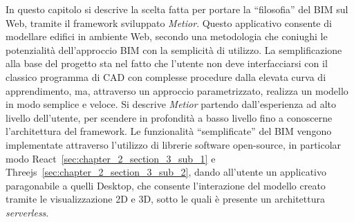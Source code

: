 In questo capitolo si descrive la scelta fatta per portare la ``filosofia'' del BIM sul Web, tramite il framework sviluppato
\emph{Metior}.
Questo applicativo consente di modellare edifici in ambiente Web, secondo una metodologia che coniughi le potenzialità
dell’approccio BIM con la semplicità di utilizzo.
La semplificazione alla base del progetto sta nel fatto che l'utente non deve interfacciarsi con il classico programma
di CAD con complesse procedure dalla elevata curva di apprendimento, ma, attraverso un approccio parametrizzato,
realizza un modello in modo semplice e veloce.
Si descrive \emph{Metior} partendo dall'esperienza ad alto livello dell'utente, per scendere in profondità
a basso livello fino a conoscerne l'architettura del framework.
Le funzionalità ``semplificate'' del BIM vengono implementate attraverso l'utilizzo di librerie software open-source,
in particolar modo React~\ref{sec:chapter_2_section_3_sub_1}
 e Threejs~\ref{sec:chapter_2_section_3_sub_2}, dando all'utente un applicativo paragonabile a quelli
Desktop, che consente l'interazione del modello creato tramite le visualizzazione 2D e 3D, sotto le quali
è presente un architettura \emph{serverless}.
\newpage
